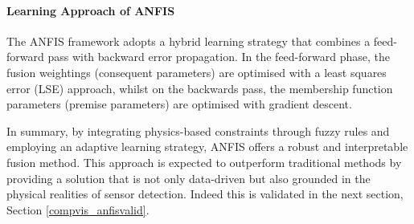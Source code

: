     
    \paragraph{Learning Approach of ANFIS}
    
        The ANFIS framework adopts a hybrid learning strategy that combines a feed-forward pass with backward error propagation. In the feed-forward phase, the fusion weightings (consequent parameters) are optimised with a least squares error (LSE) approach, whilst on the backwards pass, the membership function parameters (premise parameters) are optimised with gradient descent.
        
    
    In summary, by integrating physics-based constraints through fuzzy rules and employing an adaptive learning strategy, ANFIS offers a robust and interpretable fusion method. This approach is expected to outperform traditional methods by providing a solution that is not only data-driven but also grounded in the physical realities of sensor detection. Indeed this is validated in the next section, Section \ref{compvis_anfisvalid}.
    